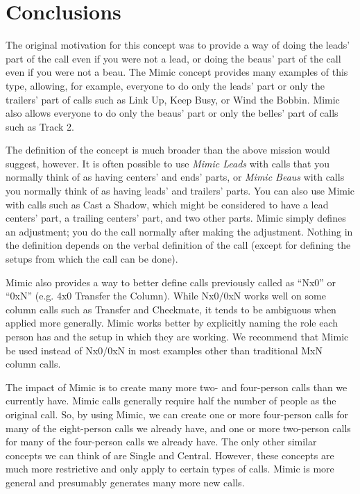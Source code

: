 \documentclass[12pt]{article}
\begin{document}
\section{Conclusions}

The original motivation for this concept was to provide a way of
doing the leads' part of the call even if you were not a lead,
or doing the beaus' part of the call even if you were not a beau.
The Mimic concept provides many examples of this type, allowing, for
example, everyone to do only the leads' part or only the trailers'
part of calls such as Link Up, Keep Busy, or Wind the Bobbin.
Mimic also allows everyone to do only the beaus' part or
only the belles' part of calls such as Track 2.

The definition of the concept is much broader than the above
mission would suggest, however.
It is often possible to use \emph{Mimic Leads}
with calls that you normally think
of as having centers' and ends' parts, or \emph{Mimic Beaus} with
calls you normally think of as having leads' and trailers' parts.
You can also use Mimic with calls such as Cast a Shadow,
which might be considered to have a lead centers' part, a trailing
centers' part, and two other parts.
Mimic simply defines an adjustment; you do the call normally
after making the adjustment.  Nothing in the definition depends on
the verbal definition of the call (except for defining the setups
from which the call can be done).

Mimic also provides a way to better define calls previously
called as ``Nx0'' or ``0xN'' (e.g. 4x0 Transfer the Column).
While Nx0/0xN works well on some column calls such as
Transfer and Checkmate, 
it tends to be ambiguous when applied more generally.
Mimic works better by explicitly naming the role each person has
and the setup in which they are working.
We recommend that Mimic be used instead of Nx0/0xN in most examples
other than traditional MxN column calls.

The impact of Mimic is to create many more two- and four-person calls
than we currently have.  Mimic calls generally require half the number of
people as the original call.  So, by using Mimic, we can create one
or more four-person calls for many of the eight-person calls we already
have, and one or more two-person calls for many of the four-person
calls we already have.  The only other similar concepts we can think of
are Single and Central.  However, these concepts are much more restrictive
and only apply to certain types of calls.  Mimic is more general and
presumably generates many more new calls.
\end{document}

